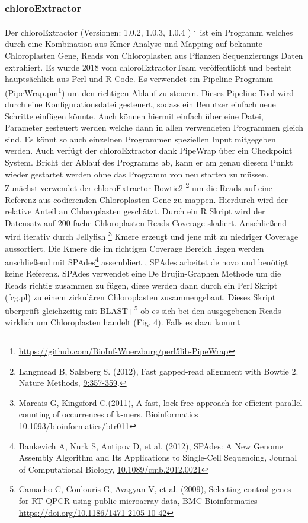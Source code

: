 \documentclass{scrartcl}
\begin{document}
\subsubsection{chloroExtractor}
\label{sec-2-5-1}
Der chloroExtractor (Versionen: 1.0.2, 1.0.3, 1.0.4 ) \footnotemark[16]{}\textsuperscript{,}\,\footnotemark[17]{} ist ein Programm welches durch eine Kombination aus Kmer Analyse und Mapping auf bekannte Chloroplasten Gene, Reads von Chloroplasten aus Pflanzen Sequenzierungs Daten
extrahiert. Es wurde 2018 vom chloroExtractorTeam veröffentlicht \footnotemark[16]{} und besteht hauptsächlich aus Perl und R Code. Es verwendet ein Pipeline Programm (PipeWrap.pm\footnote{\url{https://github.com/BioInf-Wuerzburg/perl5lib-PipeWrap}}) um den richtigen Ablauf zu steuern.
Dieses Pipeline Tool wird durch eine Konfigurationsdatei gesteuert, sodass ein Benutzer einfach neue Schritte einfügen könnte. Auch können hiermit einfach über eine Datei, Parameter gesteuert werden welche dann in 
allen verwendeten Programmen gleich sind. Es könnt so auch einzelnen Programmen speziellen Input mitgegeben werden. Auch verfügt der chloroExtractor dank PipeWrap über ein Checkpoint System. Bricht der Ablauf des Programms
ab, kann er am genau diesem Punkt wieder gestartet werden ohne das Programm von neu starten zu müssen. Zunächst verwendet der chloroExtractor Bowtie2 \footnote{Langmead B, Salzberg S. (2012), Fast gapped-read alignment with Bowtie 2. Nature Methods, \url{9:357-359}.} um die Reads auf eine Referenz aus codierenden Chloroplasten Gene zu mappen.
Hierdurch wird der relative Anteil an Chloroplasten geschätzt. Durch ein R Skript wird der Datensatz auf 200-fache Chloroplasten Reads Coverage skaliert. Anschließend wird iterativ durch Jellyfish \footnote{Marcais G, Kingsford C.(2011), A fast, lock-free approach for efficient parallel counting of occurrences of k-mers. Bioinformatics  \url{10.1093/bioinformatics/btr011}} Kmere erzeugt und jene mit
zu niedriger Coverage aussortiert. Die Kmere die im richtigen Coverage Bereich liegen werden anschließend mit SPAdes\footnote{Bankevich A, Nurk S, Antipov D, et al. (2012), SPAdes: A New Genome Assembly Algorithm and Its Applications to Single-Cell Sequencing, Journal of Computational Biology, \url{10.1089/cmb.2012.0021}} assembliert , SPAdes arbeitet de novo und benötigt
keine Referenz. SPAdes verwendet eine De Brujin-Graphen Methode um die Reads richtig zusammen zu fügen, diese werden dann durch ein Perl Skript (fcg.pl) zu einem zirkulären Chloroplasten zusammengebaut. Dieses Skript überprüft
gleichzeitig mit BLAST+\footnote{Camacho C, Coulouris G, Avagyan V, et al. (2009), Selecting control genes for RT-QPCR using public microarray data, BMC Bioinformatics \url{https://doi.org/10.1186/1471-2105-10-42}} ob es sich bei den ausgegebenen Reads wirklich um Chloroplasten handelt (Fig. 4). Falls es dazu kommt
\end{document}
